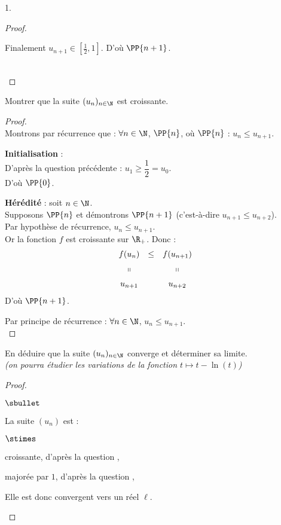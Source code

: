 \documentclass[11pt]{article}%
\begin{document}
\begin{noliste}{1.}
\begin{proof}
\begin{noliste}{\fitem}
 \newpage
 
  Finalement $u_{n+1}\in \left[\frac{1}{2},1\right]$. D'où $\PP{n+1}$.
 \end{noliste}
 ~\\[-1cm]
\end{proof}

\item Montrer que la suite $(u_n)_{n\in \N}$ est croissante.

  \begin{proof}~\\
    Montrons par récurrence que : $\forall n\in\N$, $\PP{n}$, \quad où
    \quad $\PP{n}$ : $u_n\leq u_{n+1}$.
    \begin{noliste}{\fitem}
    \item {\bf Initialisation} : \\
      D'après la question 
      précédente : $u_1\geq \dfrac{1}{2} =u_0$.\\
      D'où $\PP{0}$.
      
    \item {\bf Hérédité} : soit $n\in\N$.\\
      Supposons $\PP{n}$ et démontrons $\PP{n+1}$ (c'est-à-dire
      $u_{n+1} \leq u_{n+2}$).\\
      Par hypothèse de récurrence, $u_n \leq u_{n+1}$.\\
      Or la fonction $f$ est croissante sur $\R_+$. Donc :
      \[
      \begin{array}{ccc}
        f(u_n) & \leq & f(u_{n+1})
        \\[.2cm]
        \shortparallel & & \shortparallel
        \\[.2cm]
        u_{n+1} & & u_{n+2}
      \end{array}
      \]
      D'où $\PP{n+1}$.
    \end{noliste}
    Par principe de récurrence : $\forall n\in\N$, $u_n\leq u_{n+1}$.%
    ~\\[-1cm]
  \end{proof}

\item En déduire que la suite $(u_n)_{n\in \N}$ converge et déterminer
  sa limite.\\
  {\it (on pourra étudier les variations de la fonction $t\mapsto
    t-\ln(t)$)}

\begin{proof}~
 \begin{noliste}{$\sbullet$}
  \item La suite $(u_n)$ est :
  \begin{noliste}{$\stimes$}
    \item croissante, d'après la question ,
    \item majorée par $1$, d'après la question ,
  \end{noliste}
  Elle est donc convergent vers un réel $\ell$.
  

\end{noliste}
\end{proof}
\end{noliste}
\end{document}
